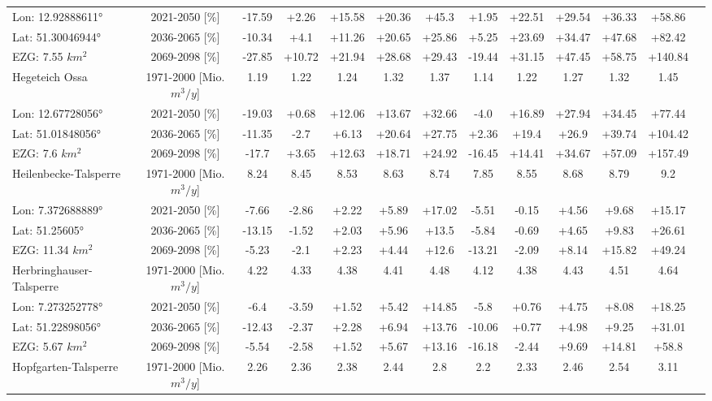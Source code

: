\begin{longtable}{@{\extracolsep{\fill}}lc|ccccc||cccccc}
\cline{2-12} 
Lon: 12.92888611° & 2021-2050 [\%]  & -17.59 & +2.26 & +15.58 & +20.36 & +45.3 & +1.95 & +22.51 & +29.54 & +36.33 & +58.86\\ 
Lat: 51.30046944° & 2036-2065 [\%]  & -10.34 & +4.1 & +11.26 & +20.65 & +25.86 & +5.25 & +23.69 & +34.47 & +47.68 & +82.42\\ 
EZG: 7.55 $km^2$ & 2069-2098 [\%]  & -27.85 & +10.72 & +21.94 & +28.68 & +29.43 & -19.44 & +31.15 & +47.45 & +58.75 & +140.84\\ 
\hline 
Hegeteich Ossa & 1971-2000 [Mio. $m^3/y$]  & 1.19 & 1.22 & 1.24 & 1.32 & 1.37 & 1.14 & 1.22 & 1.27 & 1.32 & 1.45\\ 
\cline{2-12} 
Lon: 12.67728056° & 2021-2050 [\%]  & -19.03 & +0.68 & +12.06 & +13.67 & +32.66 & -4.0 & +16.89 & +27.94 & +34.45 & +77.44\\ 
Lat: 51.01848056° & 2036-2065 [\%]  & -11.35 & -2.7 & +6.13 & +20.64 & +27.75 & +2.36 & +19.4 & +26.9 & +39.74 & +104.42\\ 
EZG: 7.6 $km^2$ & 2069-2098 [\%]  & -17.7 & +3.65 & +12.63 & +18.71 & +24.92 & -16.45 & +14.41 & +34.67 & +57.09 & +157.49\\ 
\hline 
Heilenbecke-Talsperre & 1971-2000 [Mio. $m^3/y$]  & 8.24 & 8.45 & 8.53 & 8.63 & 8.74 & 7.85 & 8.55 & 8.68 & 8.79 & 9.2\\ 
\cline{2-12} 
Lon: 7.372688889° & 2021-2050 [\%]  & -7.66 & -2.86 & +2.22 & +5.89 & +17.02 & -5.51 & -0.15 & +4.56 & +9.68 & +15.17\\ 
Lat: 51.25605° & 2036-2065 [\%]  & -13.15 & -1.52 & +2.03 & +5.96 & +13.5 & -5.84 & -0.69 & +4.65 & +9.83 & +26.61\\ 
EZG: 11.34 $km^2$ & 2069-2098 [\%]  & -5.23 & -2.1 & +2.23 & +4.44 & +12.6 & -13.21 & -2.09 & +8.14 & +15.82 & +49.24\\ 
\hline 
Herbringhauser-Talsperre & 1971-2000 [Mio. $m^3/y$]  & 4.22 & 4.33 & 4.38 & 4.41 & 4.48 & 4.12 & 4.38 & 4.43 & 4.51 & 4.64\\ 
\cline{2-12} 
Lon: 7.273252778° & 2021-2050 [\%]  & -6.4 & -3.59 & +1.52 & +5.42 & +14.85 & -5.8 & +0.76 & +4.75 & +8.08 & +18.25\\ 
Lat: 51.22898056° & 2036-2065 [\%]  & -12.43 & -2.37 & +2.28 & +6.94 & +13.76 & -10.06 & +0.77 & +4.98 & +9.25 & +31.01\\ 
EZG: 5.67 $km^2$ & 2069-2098 [\%]  & -5.54 & -2.58 & +1.52 & +5.67 & +13.16 & -16.18 & -2.44 & +9.69 & +14.81 & +58.8\\ 
\hline 
Hopfgarten-Talsperre & 1971-2000 [Mio. $m^3/y$]  & 2.26 & 2.36 & 2.38 & 2.44 & 2.8 & 2.2 & 2.33 & 2.46 & 2.54 & 3.11\\ 

\end{longtable}
